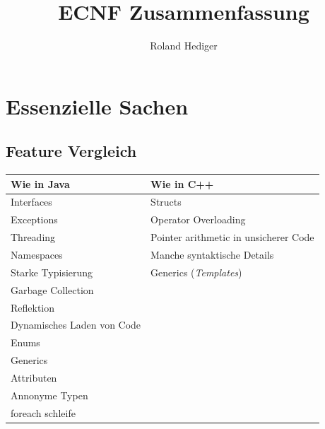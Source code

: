 \documentclass[a4paper,10pt]{scrartcl}
\title{ECNF Zusammenfassung}
\author{Roland Hediger}
\begin{document}
\maketitle
\tableofcontents

\pagebreak
\section{Essenzielle Sachen}

\subsection{Feature Vergleich}

\begin{tabular}{|l|l|}
\hline
 \textbf{Wie in Java} & \textbf{Wie in C++} \\
 \hline
 Interfaces & Structs \\ \hline
 Exceptions & Operator Overloading \\ \hline
 Threading & Pointer arithmetic in unsicherer Code \\ \hline
 Namespaces & Manche syntaktische Details \\ \hline
 Starke Typisierung & Generics (\textit{Templates}) \\ \hline
 Garbage Collection & \\ \hline
 Reflektion & \\  \hline
 Dynamisches Laden von Code & \\ \hline
 Enums & \\ \hline
 Generics & \\ \hline
 Attributen & \\ \hline
 Annonyme Typen & \\ \hline
 foreach schleife & \\ \hline
\end{tabular}
\end{document}

